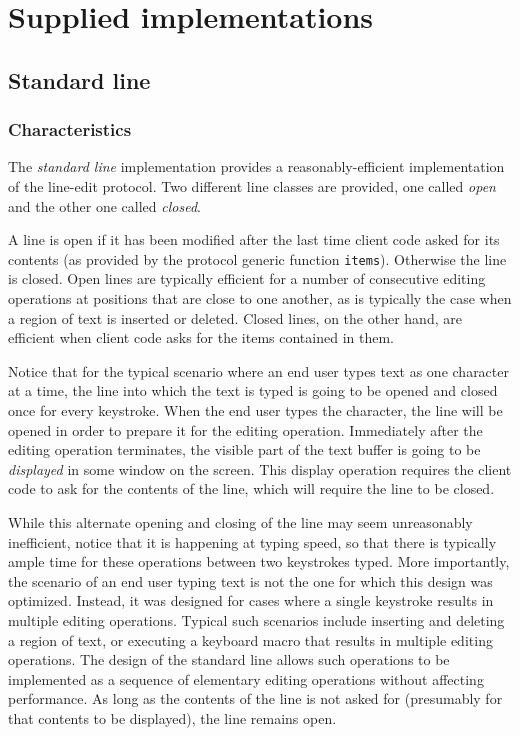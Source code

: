 \chapter{Supplied implementations}
\label{chap-supplied-implementations}

\section{Standard line}
\label{sec-standard-line}

\subsection{Characteristics}

The \emph{standard line} implementation provides a
reasonably-efficient implementation of the line-edit protocol.  Two
different line classes are provided, one called \emph{open} and the
other one called \emph{closed}.

A line is open if it has been modified after the last time client code
asked for its contents (as provided by the protocol generic function
\texttt{items}).  Otherwise the line is closed.  Open lines are
typically efficient for a number of consecutive editing operations at
positions that are close to one another, as is typically the case when
a region of text is inserted or deleted.  Closed lines, on the other
hand, are efficient when client code asks for the items contained in
them.

Notice that for the typical scenario where an end user types text as
one character at a time, the line into which the text is typed is
going to be opened and closed once for every keystroke.  When the end
user types the character, the line will be opened in order to prepare
it for the editing operation.  Immediately after the editing operation
terminates, the visible part of the text buffer is going to be
\emph{displayed} in some window on the screen.  This display operation
requires the client code to ask for the contents of the line, which
will require the line to be closed.

While this alternate opening and closing of the line may seem
unreasonably inefficient, notice that it is happening at typing speed,
so that there is typically ample time for these operations between two
keystrokes typed.  More importantly, the scenario of an end user
typing text is not the one for which this design was optimized.
Instead, it was designed for cases where a single keystroke results in
multiple editing operations.  Typical such scenarios include inserting
and deleting a region of text, or executing a keyboard macro that
results in multiple editing operations.  The design of the standard
line allows such operations to be implemented as a sequence of
elementary editing operations without affecting performance.  As long
as the contents of the line is not asked for (presumably for that
contents to be displayed), the line remains open.

